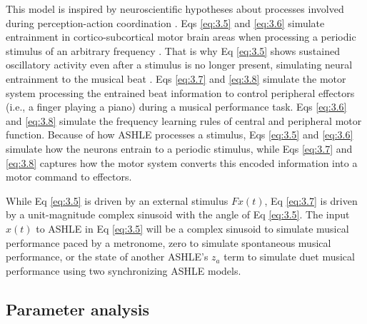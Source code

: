 \documentclass[10pt,letterpaper]{article}
\begin{document}
This model is inspired by neuroscientific hypotheses about processes involved during perception-action coordination \cite{large2015neural}. Eqs \eqref{eq:3.5} and \eqref{eq:3.6} simulate entrainment in cortico-subcortical motor brain areas when processing a periodic stimulus of an arbitrary frequency \cite{daly2014changes, grahn2009feeling, grahn2013finding}. That is why Eq \eqref{eq:3.5} shows sustained oscillatory activity even after a stimulus is no longer present, simulating neural entrainment to the musical beat \cite{large2015neural}. Eqs \eqref{eq:3.7} and \eqref{eq:3.8} simulate the motor system processing the entrained beat information to control peripheral effectors (i.e., a finger playing a piano) during a musical performance task. Eqs \eqref{eq:3.6} and \eqref{eq:3.8} simulate the frequency learning rules of central and peripheral motor function. Because of how ASHLE processes a stimulus, Eqs \eqref{eq:3.5} and \eqref{eq:3.6} simulate how the neurons entrain to a periodic stimulus, while Eqs \eqref{eq:3.7} and \eqref{eq:3.8} captures how the motor system converts this encoded information into a motor command to effectors.

While Eq \eqref{eq:3.5} is driven by an external stimulus $Fx(t)$, Eq \eqref{eq:3.7} is driven by a unit-magnitude complex sinusoid with the angle of Eq \eqref{eq:3.5}. The input $x(t)$ to ASHLE in Eq \eqref{eq:3.5} will be a complex sinusoid to simulate musical performance paced by a metronome, zero to simulate spontaneous musical performance, or the state of another ASHLE's $z_a$ term to simulate duet musical performance using two synchronizing ASHLE models.

\subsection*{Parameter analysis}
\end{document}

